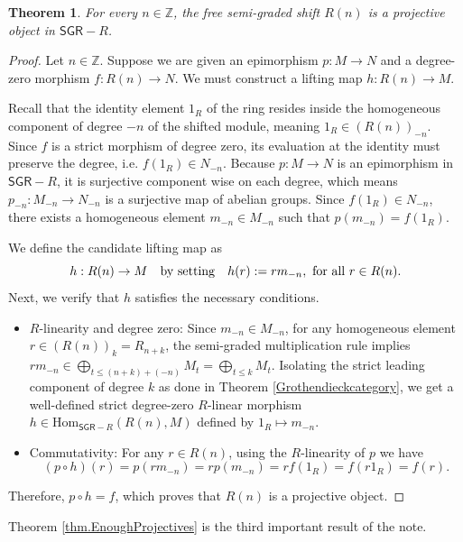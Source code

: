 \documentclass[reqno]{amsart}
\newtheorem{theorem}{Theorem}[section]
\theoremstyle{definition}
\theoremstyle{remark}
\numberwithin{equation}{section}
\begin{document}
\begin{theorem}\label{thm.ShiftsAreProjective}
For every $n \in \mathbb{Z}$, the free semi-graded shift $R(n)$ is a projective object in $\mathsf{SGR}-R$.
\end{theorem}

\begin{proof}
Let $n \in \mathbb{Z}$. Suppose we are given an epimorphism $p: M \to N$ and a degree-zero morphism $f: R(n) \to N$. We must construct a lifting map $h: R(n) \to M$.

Recall that the identity element $1_R$ of the ring resides inside the homogeneous component of degree $-n$ of the shifted module, meaning $1_R \in (R(n))_{-n}$. Since $f$ is a strict morphism of degree zero, its evaluation at the identity must preserve the degree, i.e. $f(1_R) \in N_{-n}$. Because $p: M \to N$ is an epimorphism in $\mathsf{SGR}-R$, it is surjective component wise on each degree, which means $p_{-n}: M_{-n} \to N_{-n}$ is a surjective map of abelian groups. Since $f(1_R) \in N_{-n}$, there exists a homogeneous element $m_{-n} \in M_{-n}$ such that $p(m_{-n}) = f(1_R)$.

We define the candidate lifting map as 
$$
h: R(n) \to M \quad {\rm by \ setting} \quad h(r) := r  m_{-n}, \ {\rm for \ all} \ r \in R(n).
$$
Next, we verify that $h$ satisfies the necessary conditions.
\begin{itemize}
\item $R$-linearity and degree zero: Since $m_{-n} \in M_{-n}$, for any homogeneous element $r \in (R(n))_k = R_{n+k}$, the semi-graded multiplication rule implies $r m_{-n} \in \bigoplus_{t \leq (n+k)+(-n)} M_t = \bigoplus_{t \leq k} M_t$. Isolating the strict leading component of degree $k$ as done in Theorem \ref{Grothendieckcategory}, we get a well-defined strict degree-zero $R$-linear morphism $h \in \text{Hom}_{\mathsf{SGR}-R}(R(n), M)$ defined by  $1_R \mapsto m_{-n}$.

\item Commutativity: For any $r \in R(n)$, using the $R$-linearity of $p$ we have
    \[
    (p \circ h)(r) = p(r m_{-n}) = r p(m_{-n}) = r f(1_R) = f(r 1_R) = f(r).
    \]
\end{itemize}
Therefore, $p \circ h = f$, which proves that $R(n)$ is a projective object.
\end{proof}

Theorem \ref{thm.EnoughProjectives} is the third important result of the note.
\end{document}
